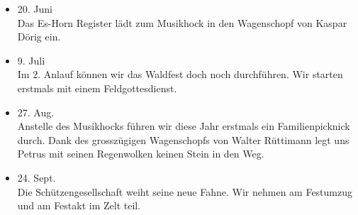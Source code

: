 \begin{history}
\begin{itemize}
        \item[]20. Juni\\
        Das Es-Horn Register lädt zum Musikhock in den Wagenschopf von Kaspar
        Dörig ein.

        \item[]9. Juli\\
        Im 2. Anlauf können wir das Waldfest doch noch durchführen. Wir starten
        erstmals mit einem Feldgottesdienst.

        \item[]27. Aug.\\
        Anstelle des Musikhocks führen wir diese Jahr erstmals ein
        Familienpicknick durch. Dank des grosszügigen Wagenschopfs von Walter
        Rüttimann legt uns Petrus mit seinen Regenwolken keinen Stein in den
        Weg.

        \item[]24. Sept.\\
        Die Schützengesellschaft weiht seine neue Fahne. Wir nehmen am Festumzug
        und am Festakt im Zelt teil.

    \end{itemize}

\end{history}
